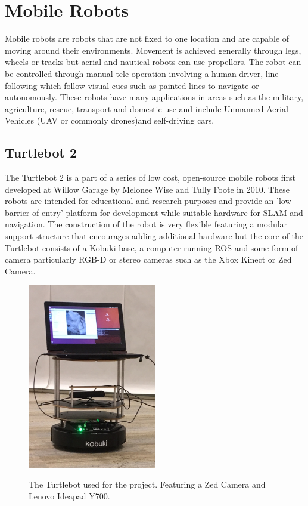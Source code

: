 \documentclass{mproj}
\begin{document}
\section{Mobile Robots}


Mobile robots are robots that are not fixed to one location and are capable of moving around their environments. Movement is achieved generally through legs, wheels or tracks but aerial and nautical robots can use propellors. The robot can be controlled through manual-tele operation involving a human driver, line-following which follow visual cues such as painted lines to navigate or autonomously. These robots have many applications in areas such as the military, agriculture, rescue, transport and domestic use and include Unmanned Aerial Vehicles (UAV or commonly drones)and self-driving cars.

\subsection{Turtlebot 2}

The Turtlebot 2 is a part of a series of low cost, open-source mobile robots first developed at Willow Garage by Melonee Wise and Tully Foote in 2010. These robots are intended for educational and research purposes and provide an 'low-barrier-of-entry' platform for development while suitable hardware for SLAM and navigation\cite{turtlebot}. The construction of the robot is very flexible featuring a modular support structure that encourages adding additional hardware but the core of the Turtlebot consists of a Kobuki base, a computer running ROS and some form of camera particularly RGB-D or stereo cameras such as the Xbox Kinect or Zed Camera.

\begin{figure}[h]
  \caption{The Turtlebot used for the project. Featuring a Zed Camera and Lenovo Ideapad Y700.}
  \centering
  \includegraphics[width=0.5\textwidth]{images/turtlebot.JPG}
  \label{fig:Turtlebot}
\end{figure}
 
\end{document}
